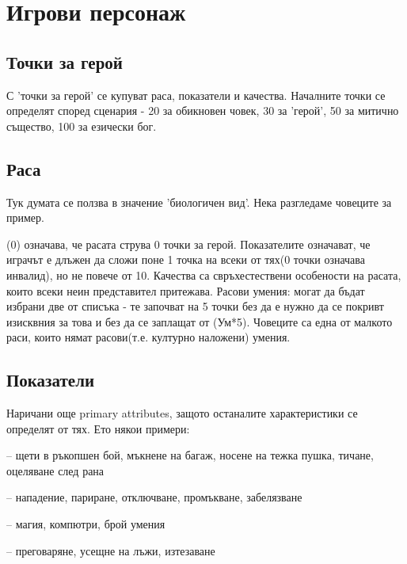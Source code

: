 
\section{Игрови персонаж}

\subsection{Точки за герой}
С 'точки за герой' се купуват раса, показатели и качества.
Началните точки се определят според сценария - 20 за обикновен човек, 30 за 'герой', 50 за митично същество, 100 за езически бог.


\subsection{Раса}
Тук думата се ползва в значение 'биологичен вид'.
Нека разгледаме човеците за пример.
\begin{multicols}{2}
(0) означава, че расата струва 0 точки за герой.
Показателите означават, че играчът е длъжен да сложи поне 1 точка на всеки от тях(0 точки означава инвалид), но не повече от 10.
Качества са свръхестествени особености на расата, които всеки неин представител притежава.
Расови умения: могат да бъдат избрани две от списъка - те започват на 5 точки без да е нужно да се покривт изисквния за това и без да се заплащат от (Ум*5).
Човеците са една от малкото раси, които нямат расови(т.е. културно наложени) умения.
\end{multicols}


\subsection{Показатели}
Наричани още primary attributes, защото останалите характеристики се определят от тях.
Ето някои примери:
\begin{itemize*}
\item {} – щети в ръкопшен бой, мъкнене на багаж, носене на тежка пушка, тичане, оцеляване след рана
\item {} – нападение, париране, отключване, промъкване, забелязване
\item {} – магия, компютри, брой умения
\item {} – преговаряне, усещне на лъжи, изтезаване
\end{itemize*}


